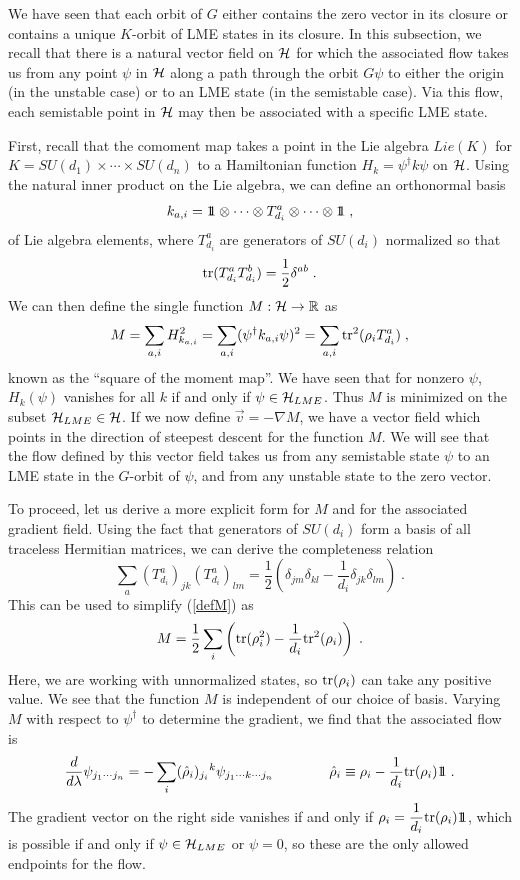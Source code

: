 \documentclass[12pt]{article}
\theoremstyle{definition}
\newcommand{\be}{\begin{equation}}
\newcommand{\ee}{\end{equation}}
\def\identity{{\rlap{1} \hskip 1.6pt \hbox{1}}}
\newcommand{\tr}{{\rm tr}}
\begin{document}
We have seen that each orbit of $G$ either contains the zero vector in its closure or contains a unique $K$-orbit of LME states in its closure. In this subsection, we recall that there is a natural vector field on ${\cal H}$ for which the associated flow takes us from any point $\psi$ in ${\cal H}$ along a path through the orbit $G \psi$ to either the origin (in the unstable case) or to an LME state (in the semistable case). Via this flow, each semistable point in ${\cal H}$ may then be associated with a specific LME state.

First, recall that the comoment map takes a point in the Lie algebra $Lie(K)$ for $K = SU(d_1) \times \cdots \times SU(d_n)$ to a Hamiltonian function $H_k = \psi^\dagger k \psi$ on ${\cal H}$. Using the natural inner product on the Lie algebra, we can define an orthonormal basis
\be
k_{a,i} = \identity  \otimes \cdots  \otimes T_{d_i}^a  \otimes \cdots  \otimes \identity \; ,
\ee
of Lie algebra elements, where $T^a_{d_i}$ are generators of $SU(d_i)$ normalized so that
\be
\tr(T^a_{d_i} T^b_{d_i}) = \frac{1}{2} \delta^{a b} \; .
\ee
We can then define the single function $M : {\cal H} \to \mathbb{R}$ as
\be
\label{defM}
M = \sum_{a,i} H^2_{k_{a,i}} = \sum_{a,i} (\psi^\dagger k_{a,i} \psi)^2 = \sum_{a,i} \tr^2(\rho_i T^a_{d_i})   \; ,
\ee
known as the ``square of the moment map''. We have seen that for nonzero $\psi$, $H_k(\psi)$ vanishes for all $k$ if and only if $\psi \in {\cal H}_{LME}$. Thus $M$ is minimized on the subset ${\cal H}_{LME} \in {\cal H}$. If we now define $\vec{v} = -\nabla M$, we have a vector field which points in the direction of steepest descent for the function $M$. We will see that the flow defined by this vector field takes us from any semistable state $\psi$ to an LME state in the $G$-orbit of $\psi$, and from any unstable state to the zero vector.

To proceed, let us derive a more explicit form for $M$ and for the associated gradient field. Using the fact that generators of $SU(d_i)$ form a basis of all traceless Hermitian matrices, we can derive the completeness relation
\be
\sum_a (T^a_{d_i})_{jk} (T^a_{d_i})_{lm} = \frac{1}{2} (\delta_{jm} \delta_{kl} - \frac{1}{d_i} \delta_{jk} \delta_{lm}) \; .
\ee
This can be used to simplify (\ref{defM}) as
\be
M = \frac{1}{2} \sum_{i} \left(\tr(\rho_i^2) - \frac{1}{d_i} \tr^2(\rho_i)\right) \; .
\ee
Here, we are working with unnormalized states, so $\tr(\rho_i)$ can take any positive value. We see that the function $M$ is independent of our choice of basis. Varying $M$ with respect to $\psi^\dagger$ to determine the gradient, we find that the associated flow is
\be
\label{gradflow}
\frac{d}{d\lambda} \psi_{j_1 \cdots j_n}  = - \sum_i  (\hat{\rho}_i)_{j_i} {}^{k} \psi_{j_1 \cdots k \cdots j_n} \qquad \qquad \hat{\rho}_i \equiv \rho_i - \frac{1}{d_i} \tr(\rho_i) \identity \; .
\ee
The gradient vector on the right side vanishes if and only if $\rho_i = \dfrac{1}{d_i} \tr(\rho_i) \identity$, which is possible if and only if $\psi \in {\cal H}_{LME}$ or $\psi = 0$, so these are the only allowed endpoints for the flow.
\end{document}
